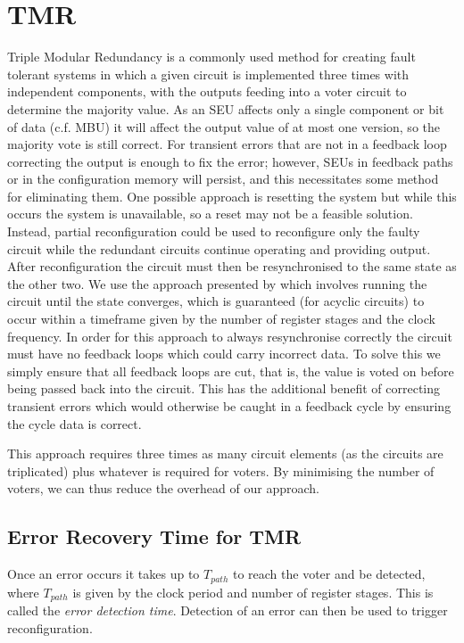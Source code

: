\documentclass[12pt,final,oneside]{dwThesis} %
\begin{document}
   \section{\gls{TMR}
   }\label{secTMR} Triple Modular Redundancy is a
   commonly used method for creating fault tolerant systems in which a given
   circuit is implemented three times with independent components, with the
   outputs feeding into a voter circuit to determine the majority value. As an
   \gls{SEU} affects only a single component or bit of data (c.f. \gls{MBU}) it
   will affect the output value of at most one version, so the majority vote is
   still correct. For transient errors that are not in a feedback loop correcting
   the output is enough to fix the error; however, \glspl{SEU} in feedback paths
   or in the configuration memory will persist, and this necessitates some method
   for eliminating them. One possible approach is resetting the system but while
   this occurs the system is unavailable, so a reset may not be a feasible
   solution. Instead, partial reconfiguration could be used to reconfigure only
   the faulty circuit while the redundant circuits continue operating and
   providing output. After reconfiguration the circuit must then be resynchronised
   to the same state as the other two. We use the approach presented by
   \cite{DiesselChange} which involves running the circuit until the state
   converges, which is guaranteed (for acyclic circuits) to occur within a
   timeframe given by the number of register stages and the clock frequency. In
   order for this approach to always resynchronise correctly the circuit must have
   no feedback loops which could carry incorrect data. To solve this we simply
   ensure that all feedback loops are \gls{cut}, that is, the value is voted on
   before being passed back into the circuit. This has the additional benefit of
   correcting transient errors which would otherwise be caught in a feedback cycle
   by ensuring the cycle data is correct.

   This approach requires three times as many circuit elements (as the circuits
   are triplicated) plus whatever is required for voters. By minimising the
   number of voters, we can thus reduce the overhead of our approach.

   \subsection{Error Recovery Time for \gls{TMR}}

   Once an error occurs it takes up to $T_{path}$ to reach the voter and be
   detected, where $T_{path}$ is given by the clock period and number of
   register stages. This is called the \textit{error detection time}. Detection
   of an error can then be used to trigger reconfiguration.
\end{document}
